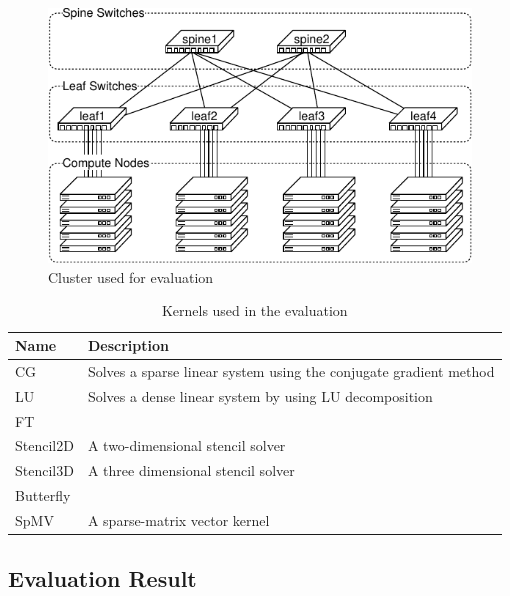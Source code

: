 \documentclass[graybox]{svmult}
\begin{document}
\begin{figure}
    \centering
    \includegraphics{evaluation_cluster}
    \caption{Cluster used for evaluation}%
    \label{kt:fig:cluster}
\end{figure}

\begin{table}[]
\caption{Kernels used in the evaluation}%
\label{kt:tbl:openflow-messages}
\begin{tabular}{ll}
\toprule
Name      & Description \\ \midrule
CG        & Solves a sparse linear system using the conjugate gradient method \\
LU        & Solves a dense linear system by using LU decomposition            \\
FT        &             \\
Stencil2D & A two-dimensional stencil solver           \\
Stencil3D & A three dimensional stencil solver            \\
Butterfly &             \\
SpMV      & A sparse-matrix vector kernel            \\ \bottomrule
\end{tabular}
\end{table}

\subsection{Evaluation Result}
\end{document}
